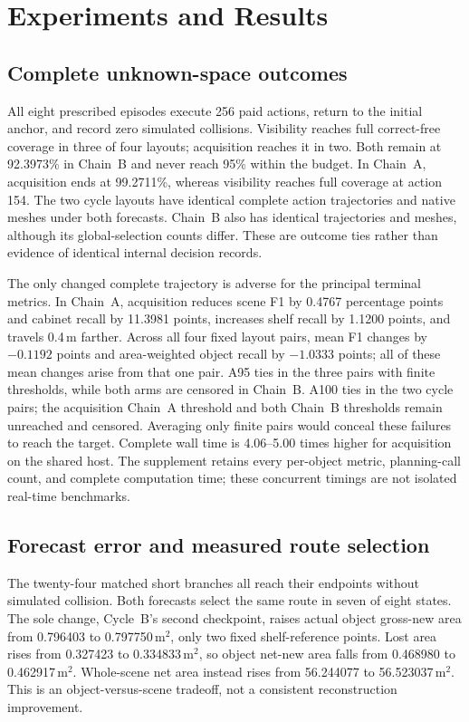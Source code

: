 \section{Experiments and Results}\label{experiments-and-results}


\subsection{Complete unknown-space outcomes}
All eight prescribed episodes execute 256 paid actions, return to the initial anchor, and record zero simulated collisions. Visibility reaches full correct-free coverage in three of four layouts; acquisition reaches it in two. Both remain at 92.3973\% in Chain~B and never reach 95\% within the budget. In Chain~A, acquisition ends at 99.2711\%, whereas visibility reaches full coverage at action 154. The two cycle layouts have identical complete action trajectories and native meshes under both forecasts. Chain~B also has identical trajectories and meshes, although its global-selection counts differ. These are outcome ties rather than evidence of identical internal decision records.




The only changed complete trajectory is adverse for the principal terminal metrics. In Chain~A, acquisition reduces scene F1 by 0.4767 percentage points and cabinet recall by 11.3981 points, increases shelf recall by 1.1200 points, and travels 0.4\,m farther. Across all four fixed layout pairs, mean F1 changes by $-0.1192$ points and area-weighted object recall by $-1.0333$ points; all of these mean changes arise from that one pair. A95 ties in the three pairs with finite thresholds, while both arms are censored in Chain~B. A100 ties in the two cycle pairs; the acquisition Chain~A threshold and both Chain~B thresholds remain unreached and censored. Averaging only finite pairs would conceal these failures to reach the target. Complete wall time is 4.06--5.00 times higher for acquisition on the shared host. The supplement retains every per-object metric, planning-call count, and complete computation time; these concurrent timings are not isolated real-time benchmarks.

\subsection{Forecast error and measured route selection}
The twenty-four matched short branches all reach their endpoints without simulated collision. Both forecasts select the same route in seven of eight states. The sole change, Cycle~B's second checkpoint, raises actual object gross-new area from 0.796403 to 0.797750\,m$^2$, only two fixed shelf-reference points. Lost area rises from 0.327423 to 0.334833\,m$^2$, so object net-new area falls from 0.468980 to 0.462917\,m$^2$. Whole-scene net area instead rises from 56.244077 to 56.523037\,m$^2$. This is an object-versus-scene tradeoff, not a consistent reconstruction improvement.

